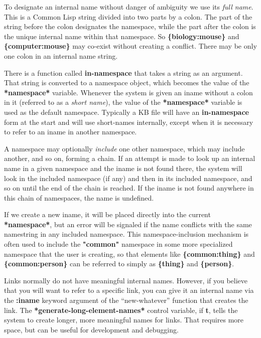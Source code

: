 \documentclass[titlepage,twoside,openright,11pt]{article}
\begin{document}
To designate an internal name without danger of ambiguity we use its
\emph{full name}. This is a Common Lisp string divided into two parts by
a colon. The part of the string before the colon designates the
namespace, while the part after the colon is the unique internal name
within that namespace. So \textbf{\{biology:mouse\}} and
\textbf{\{computer:mouse\}} may co-exist without creating a conflict.
There may be only one colon in an internal name string.

There is a function called \textbf{in-namespace} that takes a string as
an argument. That string is converted to a namespace object, which
becomes the value of the \textbf{*namespace*} variable. Whenever the
system is given an iname without a colon in it (referred to as a
\emph{short name}), the value of the \textbf{*namespace*} variable is
used as the default namespace. Typically a KB file will have an
\textbf{in-namespace} form at the start and will use short-names
internally, except when it is necessary to refer to an iname in another
namespace.

A namespace may optionally \emph{include} one other namespace, which may
include another, and so on, forming a chain. If an attempt is made to
look up an internal name in a given namespace and the iname is not found
there, the system will look in the included namespace (if any) and then
in its included namespace, and so on until the end of the chain is
reached. If the iname is not found anywhere in this chain of namespaces,
the name is undefined.

If we create a new iname, it will be placed directly into the current
\textbf{*namespace*}, but an error will be signaled if the name
conflicts with the same namestring in any included namespace. This
namespace-inclusion mechanism is often used to include the
\textbf{"common"} namespace in some more specialized namespace that the
user is creating, so that elements like \textbf{\{common:thing\}} and
\textbf{\{common:person\}} can be referred to simply as
\textbf{\{thing\}} and \textbf{\{person\}}.

Links normally do not have meaningful internal names. However, if you
believe that you will want to refer to a specific link, you can give it
an internal name via the \textbf{:iname} keyword argument of the
``new-whatever'' function that creates the link. The
\textbf{*generate-long-element-names*} control variable, if \textbf{t},
tells the system to create longer, more meaningful names for links. That
requires more space, but can be useful for development and debugging.
\end{document}
